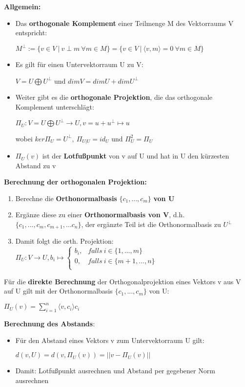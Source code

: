 \documentclass[10pt,a4paper]{article}
\begin{document}
	\textbf{Allgemein:}
	\begin{itemize}
		\item Das \textbf{orthogonale Komplement} einer Teilmenge M des Vektorraums V entspricht:
		\begin{center}
			$M^\perp := \{v \in V\ |\ v\perp m\ \forall m\in M\} = \{v\in V\ |\ \langle v, m\rangle = 0\ \forall m\in M\}$
		\end{center}
		\item Es gilt für einen Untervektorraum U zu V:
		\begin{center}
			$V = U \bigoplus U^\perp$ und $dim V = dim U + dim U^\perp$
		\end{center}
		\item Weiter gibt es die \textbf{orthogonale Projektion}, die das orthogonale Komplement unterschlägt:
		\begin{center}
			$\Pi_U: V = U \bigoplus U^\perp \rightarrow U, v = u + u^\perp \mapsto u$
		\end{center}
		wobei $ker \Pi_U = U^\perp,\ \Pi_{U|U} = id_U$ und $\Pi^2_U = \Pi_U$
		\item $\Pi_U(v)$ ist der \textbf{Lotfußpunkt} von v auf U und hat in U den kürzesten Abstand zu v
	\end{itemize}

	\newpage
	\noindent\textbf{Berechnung der orthogonalen Projektion:}
	\begin{enumerate}
		\item Berechne die \textbf{Orthonormalbasis} $\{c_1, ..., c_m\}$ \textbf{von U}
		\item Ergänze diese zu einer \textbf{Orthonormalbasis von V}, d.h. $\{c_1, ..., c_m, c_{m + 1}, ... c_n\}$, der ergänzte Teil ist die Orthonormalbasis zu $U^\perp$
		\item Damit folgt die orth. Projektion: $\Pi_U: V \rightarrow U, b_i \mapsto
		\begin{cases}
			b_i,& falls\ i \in \{1, ..., m\}\\
			0,& falls\ i \in \{m + 1, ..., n\}\\
		\end{cases}$
	\end{enumerate}
	Für die \textbf{direkte Berechnung} der Orthogonalprojektion eines Vektors v aus V auf U gilt mit der Orthonormalbasis $\{c_1, ..., c_m\}$ von U:
	\begin{center}
		$\Pi_U(v) = \sum_{i = 1}^{n} \langle v, c_i \rangle c_i$
	\end{center}
	\textbf{Berechnung des Abstands}:
	\begin{itemize}
		\item Für den Abstand eines Vektors v zum Untervektorraum U gilt:
		\begin{center}
			$d(v, U) = d(v, \Pi_U(v)) = ||v - \Pi_U(v)||$
		\end{center}
		\item Damit: Lotfußpunkt ausrechnen und Abstand per gegebener Norm ausrechnen
	\end{itemize}
\end{document}
